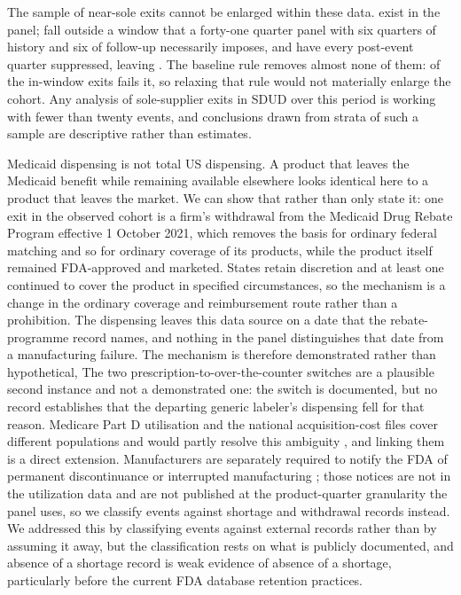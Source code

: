 \documentclass[pdflatex,sn-vancouver-num,Numbered]{sn-jnl}
\begin{document}
The sample of near-sole exits cannot be enlarged within these data. \nFlowDetectedUC exist in the
panel; \nFlowOutsideW fall outside a window that a forty-one quarter panel with six quarters of
history and six of follow-up necessarily imposes, and \nFlowSuppressedW have every post-event
quarter suppressed, leaving \nFlowObserved. The baseline rule removes almost none of them: \nFlowFailedBaseW of the \nFlowInWindow
in-window exits fails it, so relaxing that rule would not materially enlarge the cohort. Any analysis of sole-supplier exits in SDUD over this
period is working with fewer than twenty events, and conclusions drawn from strata of such a
sample are descriptive rather than estimates.

Medicaid dispensing is not total US dispensing. A product that leaves the Medicaid benefit while
remaining available elsewhere looks identical here to a product that leaves the market. We can show that
rather than only state it: one exit in the observed cohort is a firm's withdrawal from the Medicaid Drug Rebate Program
effective 1 October 2021, which removes the basis for ordinary federal matching and so for
ordinary coverage of its products, while the product itself remained FDA-approved and marketed.
States retain discretion and at least one continued to cover the product in specified
circumstances, so the mechanism is a change in the ordinary coverage and reimbursement route
rather than a prohibition. The dispensing leaves this data source on a
date that the rebate-programme record names, and nothing in the panel distinguishes that date
from a manufacturing failure. The mechanism is therefore demonstrated rather than hypothetical,
The two prescription-to-over-the-counter switches are a plausible second instance and not a
demonstrated one: the switch is documented, but no record establishes that the departing generic
labeler's dispensing fell for that reason. Medicare Part D utilisation
and the national acquisition-cost files cover different populations and would partly resolve this
ambiguity \citep{cms_partd,cms_nadac}, and linking them is a direct extension. Manufacturers are
separately required to notify the FDA of permanent discontinuance or interrupted manufacturing
\citep{fda506c}; those notices are not in the utilization data and are not published at the
product-quarter granularity the panel uses, so we classify events against shortage and withdrawal
records instead. We addressed this by
classifying events against external records rather than by assuming it away, but the classification
rests on what is publicly documented, and absence of a shortage record is weak evidence of
absence of a shortage, particularly before the current FDA database retention practices.
\end{document}
